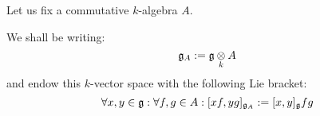         \begin{convention}
            Let us fix a commutative $k$-algebra $A$.

            We shall be writing:
                $$\g_A := \g \tensor_k A$$
            and endow this $k$-vector space with the following Lie bracket:
                $$\forall x, y \in \mathfrak{g}: \forall f, g \in A: [x f, y g]_{\mathfrak{g}_A} := [x, y]_{\mathfrak{g}} fg$$
        \end{convention}

        \begin{theorem} \label{theorem: kassel_realisation}
            
        \end{theorem}